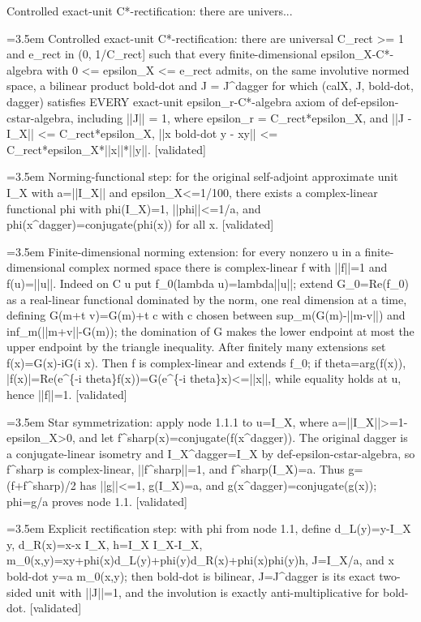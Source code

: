 \documentclass{article}
\newcommand{\step}[1]{\par\noindent\hangindent=3.5em\hangafter=1%
  \makebox[3.5em][l]{\textbf{#1.}}}
\newcommand{\steptag}[1]{\hfill{\small\textsf{[#1]}}}
\begin{document}
\begin{proofbox}{Controlled exact-unit C*-rectification: there are univers...}
\step{1} Controlled exact-unit C*-rectification: there are universal C\_rect >= 1 and e\_rect in (0, 1/C\_rect] such that every finite-dimensional epsilon\_X-C*-algebra with 0 <= epsilon\_X <= e\_rect admits, on the same involutive normed space, a bilinear product bold-dot and J = J\textasciicircum{}dagger for which (calX, J, bold-dot, dagger) satisfies EVERY exact-unit epsilon\_r-C*-algebra axiom of def-epsilon-cstar-algebra, including ||J|| = 1, where epsilon\_r = C\_rect*epsilon\_X, and ||J - I\_X|| <= C\_rect*epsilon\_X, ||x bold-dot y - xy|| <= C\_rect*epsilon\_X*||x||*||y||. \steptag{validated} \\[6pt]
\step{1.1} Norming-functional step: for the original self-adjoint approximate unit I\_X with a=||I\_X|| and epsilon\_X<=1/100, there exists a complex-linear functional phi with phi(I\_X)=1, ||phi||<=1/a, and phi(x\textasciicircum{}dagger)=conjugate(phi(x)) for all x. \steptag{validated} \\[6pt]
\step{1.1.1} Finite-dimensional norming extension: for every nonzero u in a finite-dimensional complex normed space there is complex-linear f with ||f||=1 and f(u)=||u||. Indeed on C u put f\_0(lambda u)=lambda||u||; extend G\_0=Re(f\_0) as a real-linear functional dominated by the norm, one real dimension at a time, defining G(m+t v)=G(m)+t c with c chosen between sup\_m(G(m)-||m-v||) and inf\_m(||m+v||-G(m)); the domination of G makes the lower endpoint at most the upper endpoint by the triangle inequality. After finitely many extensions set f(x)=G(x)-iG(i x). Then f is complex-linear and extends f\_0; if theta=arg(f(x)), |f(x)|=Re(e\textasciicircum{}\{-i theta\}f(x))=G(e\textasciicircum{}\{-i theta\}x)<=||x||, while equality holds at u, hence ||f||=1. \steptag{validated} \\[4pt]
\step{1.1.2} Star symmetrization: apply node 1.1.1 to u=I\_X, where a=||I\_X||>=1-epsilon\_X>0, and let f\textasciicircum{}sharp(x)=conjugate(f(x\textasciicircum{}dagger)). The original dagger is a conjugate-linear isometry and I\_X\textasciicircum{}dagger=I\_X by def-epsilon-cstar-algebra, so f\textasciicircum{}sharp is complex-linear, ||f\textasciicircum{}sharp||=1, and f\textasciicircum{}sharp(I\_X)=a. Thus g=(f+f\textasciicircum{}sharp)/2 has ||g||<=1, g(I\_X)=a, and g(x\textasciicircum{}dagger)=conjugate(g(x)); phi=g/a proves node 1.1. \steptag{validated} \\[4pt]
\step{1.2} Explicit rectification step: with phi from node 1.1, define d\_L(y)=y-I\_X y, d\_R(x)=x-x I\_X, h=I\_X I\_X-I\_X, m\_0(x,y)=xy+phi(x)d\_L(y)+phi(y)d\_R(x)+phi(x)phi(y)h, J=I\_X/a, and x bold-dot y=a m\_0(x,y); then bold-dot is bilinear, J=J\textasciicircum{}dagger is its exact two-sided unit with ||J||=1, and the involution is exactly anti-multiplicative for bold-dot. \steptag{validated} \\[6pt]

\end{proofbox}
\end{document}

